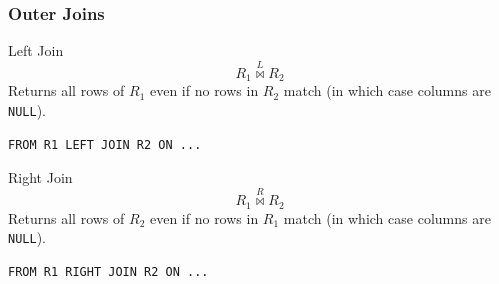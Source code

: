 \subsubsection{Outer Joins}
\begin{tcbraster}[raster columns=2, raster equal height]
    \begin{definitionbox}{Left Join}
        \[R_1 \overset{L}{\bowtie} R_2\]
        Returns all rows of $R_1$ even if no rows in $R_2$ match (in which case columns are \texttt{NULL}).

        \begin{center}
        \end{center}
        \begin{verbatim}
FROM R1 LEFT JOIN R2 ON ... 
            \end{verbatim}
    \end{definitionbox}
    \begin{definitionbox}{Right Join}
        \[R_1 \overset{R}{\bowtie} R_2\]
        Returns all rows of $R_2$ even if no rows in $R_1$ match (in which case columns are \texttt{NULL}).
        \begin{center}
        \end{center}
        \begin{verbatim}
FROM R1 RIGHT JOIN R2 ON ... 
            \end{verbatim}
    \end{definitionbox}
\end{tcbraster}
